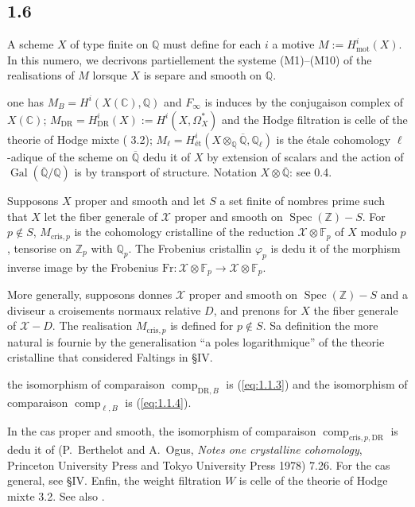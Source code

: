 \documentclass[12pt,a4paper]{article}
\theoremstyle{plain}
\theoremstyle{definition}
\theoremstyle{remark}
\DeclareMathOperator{\Spec}{Spec}
\DeclareMathOperator{\Gal}{Gal}
\newcommand{\mot}{\mathrm{mot}}
\providecommand{\Gal}{\operatorname{Gal}}
\providecommand{\Spec}{\operatorname{Spec}}
\providecommand{\mot}{\mathrm{mot}}
\providecommand{\DR}{\mathrm{DR}}
\providecommand{\cris}{\mathrm{cris}}
\providecommand{\comp}{\operatorname{comp}}
\begin{document}
\subsection*{1.6}

A scheme $X$ of type finite on $\mathbb{Q}$ must define for each $i$ a motive
$M := H^i_\mot(X)$. In this numero, we decrivons partiellement the systeme
(M1)--(M10) of the realisations of $M$ lorsque $X$ is separe and smooth on $\mathbb{Q}$.

one has $M_B = H^i(X(\mathbb{C}), \mathbb{Q})$ and $F_\infty$ is induces by the conjugaison
complex of $X(\mathbb{C})$; $M_{\DR} = H^i_{\DR}(X) := H^i(X, \Omega_X^*)$ and the
Hodge filtration is celle of the theorie of Hodge mixte (\cite{D2} 3.2);
$M_\ell = H^i_\text{\'et}(X \otimes_{\mathbb{Q}} \overline{\mathbb{Q}}, \mathbb{Q}_\ell)$ is the
étale cohomology $\ell$-adique of the scheme on $\overline{\mathbb{Q}}$ dedu it of $X$ by
extension of scalars and the action of $\Gal(\overline{\mathbb{Q}}/\mathbb{Q})$ is by transport
of structure. Notation $X \otimes \overline{\mathbb{Q}}$: see 0.4.

Supposons $X$ proper and smooth and let $S$ a set finite of nombres prime such that
$X$ let the fiber generale of $\mathcal{X}$ proper and smooth on $\Spec(\mathbb{Z}) - S$.
For $p \notin S$, $M_{\cris,p}$ is the cohomology cristalline of the reduction
$\mathcal{X} \otimes \mathbb{F}_p$ of $X$ modulo $p$, tensorise on $\mathbb{Z}_p$ with
$\mathbb{Q}_p$. The Frobenius cristallin $\varphi_p$ is dedu it of the morphism inverse image by the Frobenius $\text{Fr}: \mathcal{X} \otimes \mathbb{F}_p \to
\mathcal{X} \otimes \mathbb{F}_p$.

More generally, supposons donnes $\mathcal{X}$ proper and smooth on
$\Spec(\mathbb{Z}) - S$ and a diviseur a croisements normaux relative $D$, and prenons
for $X$ the fiber generale of $\mathcal{X} - D$. The realisation $M_{\cris,p}$ is
defined for $p \notin S$. Sa definition the more natural is fournie by the
generalisation ``a poles logarithmique'' of the theorie cristalline that considered
Faltings in \cite{Fa} \S IV.

the isomorphism of comparaison $\comp_{\DR,B}$ is (\ref{eq:1.1.3}) and the isomorphism of
comparaison $\comp_{\ell,B}$ is (\ref{eq:1.1.4}).

In the cas proper and smooth, the isomorphism of comparaison
$\comp_{\cris,p,\DR}$ is dedu it of (P.~Berthelot and A.~Ogus, \textit{Notes one
crystalline cohomology}, Princeton University Press and Tokyo University Press 1978) 7.26.
For the cas general, see \cite{Fa} \S IV. Enfin, the weight filtration $W$ is
celle of the theorie of Hodge mixte \cite{D2} 3.2. See also \cite{D5}.
\end{document}
